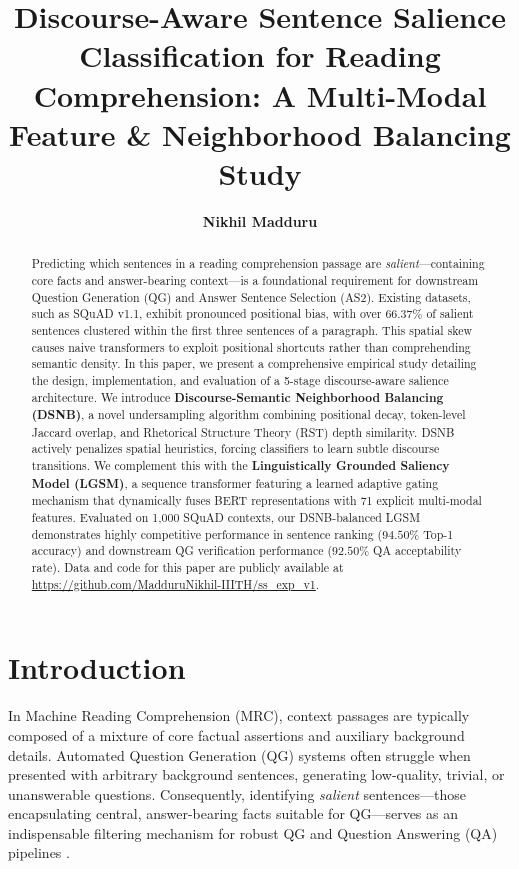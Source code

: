 \documentclass[11pt,a4paper,twocolumn]{article}
\title{\Large\bf Discourse-Aware Sentence Salience Classification for Reading Comprehension: A Multi-Modal Feature \& Neighborhood Balancing Study}
\author{
  \textbf{Nikhil Madduru}
}
\date{}
\begin{document}
\maketitle

\begin{abstract}
Predicting which sentences in a reading comprehension passage are \textit{salient}---containing core facts and answer-bearing context---is a foundational requirement for downstream Question Generation (QG) and Answer Sentence Selection (AS2). Existing datasets, such as SQuAD v1.1, exhibit pronounced positional bias, with over $66.37\%$ of salient sentences clustered within the first three sentences of a paragraph. This spatial skew causes naive transformers to exploit positional shortcuts rather than comprehending semantic density. In this paper, we present a comprehensive empirical study detailing the design, implementation, and evaluation of a 5-stage discourse-aware salience architecture. We introduce \textbf{Discourse-Semantic Neighborhood Balancing (DSNB)}, a novel undersampling algorithm combining positional decay, token-level Jaccard overlap, and Rhetorical Structure Theory (RST) depth similarity. DSNB actively penalizes spatial heuristics, forcing classifiers to learn subtle discourse transitions. We complement this with the \textbf{Linguistically Grounded Saliency Model (LGSM)}, a sequence transformer featuring a learned adaptive gating mechanism that dynamically fuses BERT representations with 71 explicit multi-modal features. Evaluated on 1,000 SQuAD contexts, our DSNB-balanced LGSM demonstrates highly competitive performance in sentence ranking ($94.50\%$ Top-1 accuracy) and downstream QG verification performance ($92.50\%$ QA acceptability rate). Data and code for this paper are publicly available at \url{https://github.com/MadduruNikhil-IIITH/ss_exp_v1}.
\end{abstract}

\section{Introduction}
In Machine Reading Comprehension (MRC), context passages are typically composed of a mixture of core factual assertions and auxiliary background details. Automated Question Generation (QG) systems \cite{du2017learning} often struggle when presented with arbitrary background sentences, generating low-quality, trivial, or unanswerable questions. Consequently, identifying \textit{salient} sentences---those encapsulating central, answer-bearing facts suitable for QG---serves as an indispensable filtering mechanism for robust QG and Question Answering (QA) pipelines \cite{jurafsky2023speech}.
\end{document}
